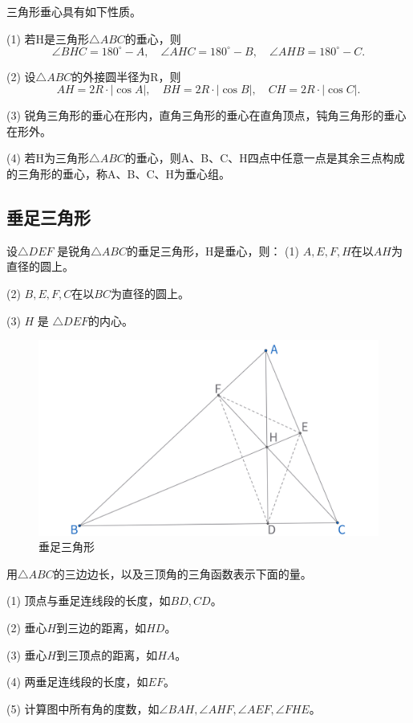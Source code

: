 \begin{proposition}[垂心性质]
    三角形垂心具有如下性质。

    (1) 若H是三角形$\triangle ABC$的垂心，则
    $$\angle BHC = 180^\circ - A,\quad \angle AHC = 180^\circ - B,\quad \angle AHB =180^\circ - C.$$

    (2) 设$\triangle ABC$的外接圆半径为R，则
    $$AH=2R\cdot |\cos A|,\quad
    BH=2R\cdot |\cos B|,\quad
    CH=2R\cdot |\cos C|.$$

    (3) 锐角三角形的垂心在形内，直角三角形的垂心在直角顶点，钝角三角形的垂心在形外。

    (4) 若H为三角形$\triangle ABC$的垂心，则A、B、C、H四点中任意一点是其余三点构成的三角形的垂心，称A、B、C、H为垂心组。
\end{proposition}


\newpage
\subsection{垂足三角形}
\begin{proposition}[垂足三角形]
    设$\triangle DEF$ 是锐角$\triangle ABC$的垂足三角形，H是垂心，则：
    (1) $A, E, F, H$在以$AH$为直径的圆上。

    (2) $B, E, F, C$在以$BC$为直径的圆上。

    (3) $H$ 是 $\triangle DEF$的内心。
\end{proposition}
\begin{figure}[H]
    \centering
    \includegraphics[width=0.8\linewidth]{figures/三角形五心/垂足三角形.png}
    \caption{垂足三角形}
\end{figure}

\begin{exercise}
    用$\triangle ABC$的三边边长，以及三顶角的三角函数表示下面的量。

    (1) 顶点与垂足连线段的长度，如$BD, CD$。

    (2) 垂心$H$到三边的距离，如$HD$。

    (3) 垂心$H$到三顶点的距离，如$HA$。

    (4) 两垂足连线段的长度，如$EF$。

    (5) 计算图中所有角的度数，如$\angle BAH, \angle AHF, \angle AEF, \angle FHE$。  
\end{exercise}




